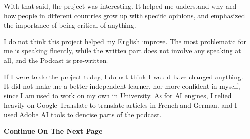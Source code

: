 \documentclass[12pt]{article}
\newcommand \npage {\vfil {\hfil \textbf{\footnotesize {Continue On The Next Page}}} \hfil \vfil \pagebreak}
\begin{document}
	With that said, the project was interesting. It helped me understand why and how people in different countries grow up with specific opinions, and emphasized the importance of being critical of anything. 
	
	I do not think this project helped my English improve. The most problematic for me is speaking fluently, while the written part does not involve any speaking at all, and the Podcast is pre-written. 
	
	If I were to do the project today, I do not think I would have changed anything. It did not make me a better independent learner, nor more confident in myself, since I am used to work on my own in University. As for AI engines, I relied heavily on Google Translate to translate articles in French and German, and I used Adobe AI tools to denoise parts of the podcast. 
	
	\npage
	
	
	
\end{document}
